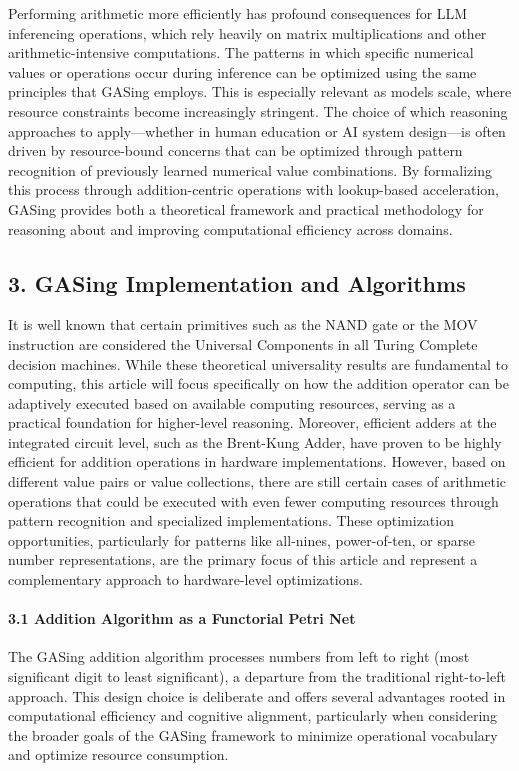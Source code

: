 \documentclass[11pt,a4paper]{article}
\begin{document}
Performing arithmetic more efficiently has profound consequences for LLM inferencing operations, which rely heavily on matrix multiplications and other arithmetic-intensive computations. The patterns in which specific numerical values or operations occur during inference can be optimized using the same principles that GASing employs. This is especially relevant as models scale, where resource constraints become increasingly stringent. The choice of which reasoning approaches to apply—whether in human education or AI system design—is often driven by resource-bound concerns that can be optimized through pattern recognition of previously learned numerical value combinations. By formalizing this process through addition-centric operations with lookup-based acceleration, GASing provides both a theoretical framework and practical methodology for reasoning about and improving computational efficiency across domains.

\subsection{3. GASing Implementation and Algorithms}
It is well known that certain primitives such as the NAND gate or the MOV instruction are considered the Universal Components in all Turing Complete decision machines. While these theoretical universality results are fundamental to computing, this article will focus specifically on how the addition operator can be adaptively executed based on available computing resources, serving as a practical foundation for higher-level reasoning. Moreover, efficient adders at the integrated circuit level, such as the Brent-Kung Adder, have proven to be highly efficient for addition operations in hardware implementations. However, based on different value pairs or value collections, there are still certain cases of arithmetic operations that could be executed with even fewer computing resources through pattern recognition and specialized implementations. These optimization opportunities, particularly for patterns like all-nines, power-of-ten, or sparse number representations, are the primary focus of this article and represent a complementary approach to hardware-level optimizations.

\paragraph{3.1 Addition Algorithm as a Functorial Petri Net}
The GASing addition algorithm processes numbers from left to right (most significant digit to least significant), a departure from the traditional right-to-left approach. This design choice is deliberate and offers several advantages rooted in computational efficiency and cognitive alignment, particularly when considering the broader goals of the GASing framework to minimize operational vocabulary and optimize resource consumption.
\end{document}
